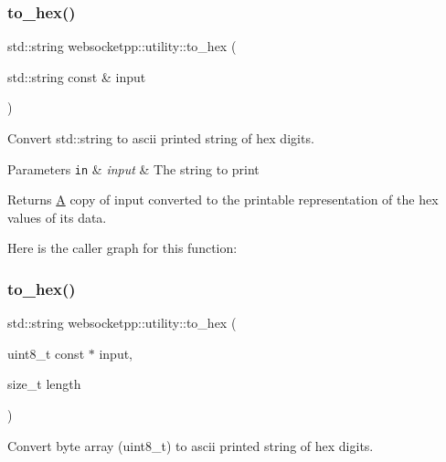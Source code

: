 \subsubsection{\texorpdfstring{to\+\_\+hex()}{to\_hex()}\hspace{0.1cm}{\footnotesize\ttfamily [1/3]}}
{\footnotesize\ttfamily std\+::string websocketpp\+::utility\+::to\+\_\+hex (\begin{DoxyParamCaption}\item[{std\+::string const \&}]{input }\end{DoxyParamCaption})\hspace{0.3cm}{\ttfamily [inline]}}



Convert std\+::string to ascii printed string of hex digits. 


\begin{DoxyParams}[1]{Parameters}
\mbox{\tt in}  & {\em input} & The string to print \\
\hline
\end{DoxyParams}
\begin{DoxyReturn}{Returns}
\mbox{\hyperlink{struct_a}{A}} copy of {\ttfamily input} converted to the printable representation of the hex values of its data. 
\end{DoxyReturn}
Here is the caller graph for this function\+:
\mbox{\label{namespacewebsocketpp_1_1utility_a42132bbbc1632f7ba964bd87ac5f288f}} 
\subsubsection{\texorpdfstring{to\+\_\+hex()}{to\_hex()}\hspace{0.1cm}{\footnotesize\ttfamily [2/3]}}
{\footnotesize\ttfamily std\+::string websocketpp\+::utility\+::to\+\_\+hex (\begin{DoxyParamCaption}\item[{uint8\+\_\+t const $\ast$}]{input,  }\item[{size\+\_\+t}]{length }\end{DoxyParamCaption})\hspace{0.3cm}{\ttfamily [inline]}}



Convert byte array (uint8\+\_\+t) to ascii printed string of hex digits. 


